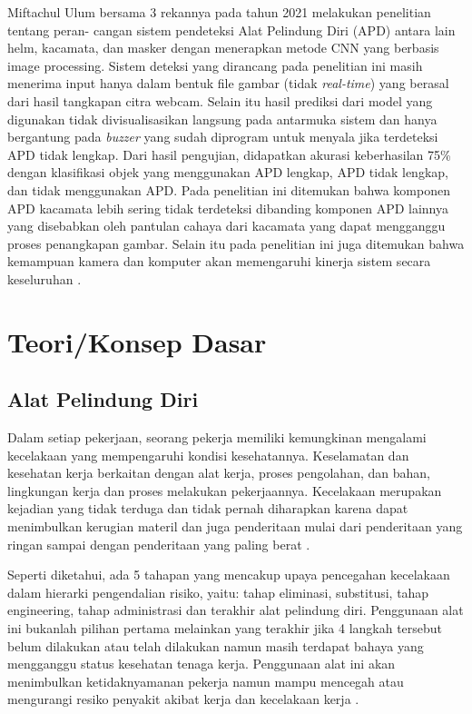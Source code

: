 Miftachul Ulum bersama 3 rekannya pada tahun 2021 melakukan penelitian tentang peran-
cangan sistem pendeteksi Alat Pelindung Diri (APD) antara lain helm, kacamata, dan masker
dengan menerapkan metode CNN yang berbasis image processing. Sistem deteksi yang dirancang pada penelitian ini masih menerima input hanya dalam bentuk file gambar (tidak \emph{real-time}) yang berasal dari hasil tangkapan citra webcam. Selain itu hasil prediksi dari model yang digunakan tidak divisualisasikan langsung pada antarmuka sistem dan hanya bergantung pada \emph{buzzer} yang sudah diprogram untuk menyala jika terdeteksi APD tidak lengkap.
Dari hasil pengujian, didapatkan akurasi keberhasilan 75\% dengan klasifikasi objek yang menggunakan APD lengkap,
APD tidak lengkap, dan tidak menggunakan APD. Pada penelitian ini ditemukan bahwa komponen APD kacamata lebih sering tidak terdeteksi dibanding komponen APD lainnya yang
disebabkan oleh pantulan cahaya dari kacamata yang dapat mengganggu proses penangkapan gambar. Selain itu pada penelitian ini juga ditemukan bahwa kemampuan kamera dan komputer
akan memengaruhi kinerja sistem secara keseluruhan \cite{miftachul_2021}.

\section{Teori/Konsep Dasar}

\subsection{Alat Pelindung Diri}
\label{apd}

Dalam setiap pekerjaan, seorang pekerja memiliki kemungkinan mengalami kecelakaan yang mempengaruhi kondisi kesehatannya. Keselamatan dan kesehatan kerja berkaitan dengan alat kerja, proses pengolahan, dan bahan, lingkungan kerja dan proses melakukan pekerjaannya. Kecelakaan merupakan kejadian yang tidak terduga dan tidak pernah diharapkan karena dapat menimbulkan kerugian materil dan juga penderitaan mulai dari penderitaan yang ringan sampai dengan penderitaan yang paling berat \cite{anizar2012}.

Seperti diketahui, ada 5 tahapan yang mencakup upaya pencegahan kecelakaan dalam hierarki pengendalian risiko, yaitu: tahap eliminasi, substitusi, tahap engineering, tahap administrasi dan terakhir alat pelindung diri. Penggunaan alat ini bukanlah pilihan pertama melainkan yang terakhir jika 4 langkah tersebut belum dilakukan atau telah dilakukan namun masih terdapat bahaya yang mengganggu status kesehatan tenaga kerja. Penggunaan alat ini akan menimbulkan ketidaknyamanan pekerja namun mampu mencegah atau mengurangi resiko penyakit akibat kerja dan kecelakaan kerja \cite{k3ptglobal}.

